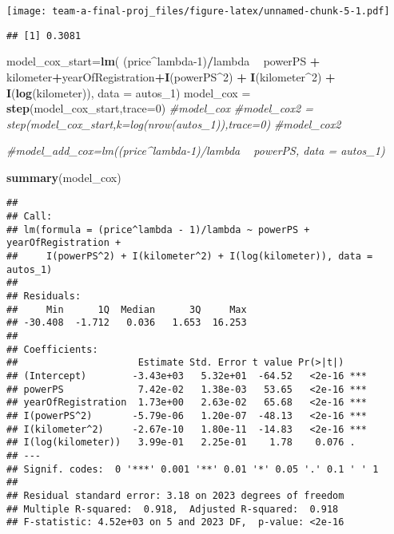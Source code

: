 \documentclass[]{article}
\newenvironment{Shaded}{\begin{snugshade}}{\end{snugshade}}
\newcommand{\CommentTok}[1]{\textcolor[rgb]{0.56,0.35,0.01}{\textit{#1}}}
\newcommand{\DataTypeTok}[1]{\textcolor[rgb]{0.13,0.29,0.53}{#1}}
\newcommand{\DecValTok}[1]{\textcolor[rgb]{0.00,0.00,0.81}{#1}}
\newcommand{\KeywordTok}[1]{\textcolor[rgb]{0.13,0.29,0.53}{\textbf{#1}}}
\newcommand{\NormalTok}[1]{#1}
\newcommand{\OperatorTok}[1]{\textcolor[rgb]{0.81,0.36,0.00}{\textbf{#1}}}
\newcommand{\StringTok}[1]{\textcolor[rgb]{0.31,0.60,0.02}{#1}}
\begin{document}
\texttt{[image: team-a-final-proj\_files/figure-latex/unnamed-chunk-5-1.pdf]}

\begin{Shaded}
\end{Shaded}

\begin{verbatim}
## [1] 0.3081
\end{verbatim}

\begin{Shaded}
\begin{Highlighting}[]
\NormalTok{model_cox_start=}\KeywordTok{lm}\NormalTok{( (price}\OperatorTok{^}\NormalTok{lambda}\DecValTok{-1}\NormalTok{)}\OperatorTok{/}\NormalTok{lambda }\OperatorTok{~}\StringTok{ }\NormalTok{powerPS }\OperatorTok{+}\StringTok{ }\NormalTok{kilometer}\OperatorTok{+}\NormalTok{yearOfRegistration}\OperatorTok{+}\KeywordTok{I}\NormalTok{(powerPS}\OperatorTok{^}\DecValTok{2}\NormalTok{) }\OperatorTok{+}\StringTok{ }\KeywordTok{I}\NormalTok{(kilometer}\OperatorTok{^}\DecValTok{2}\NormalTok{) }\OperatorTok{+}\StringTok{ }\KeywordTok{I}\NormalTok{(}\KeywordTok{log}\NormalTok{(kilometer)), }\DataTypeTok{data =}\NormalTok{ autos_}\DecValTok{1}\NormalTok{)}
\NormalTok{model_cox =}\StringTok{ }\KeywordTok{step}\NormalTok{(model_cox_start,}\DataTypeTok{trace=}\DecValTok{0}\NormalTok{)}
\CommentTok{#model_cox}
\CommentTok{#model_cox2 = step(model_cox_start,k=log(nrow(autos_1)),trace=0)}
\CommentTok{#model_cox2}

\CommentTok{#model_add_cox=lm((price^lambda-1)/lambda ~ powerPS, data = autos_1)}

\KeywordTok{summary}\NormalTok{(model_cox)}
\end{Highlighting}
\end{Shaded}

\begin{verbatim}
## 
## Call:
## lm(formula = (price^lambda - 1)/lambda ~ powerPS + yearOfRegistration + 
##     I(powerPS^2) + I(kilometer^2) + I(log(kilometer)), data = autos_1)
## 
## Residuals:
##     Min      1Q  Median      3Q     Max 
## -30.408  -1.712   0.036   1.653  16.253 
## 
## Coefficients:
##                     Estimate Std. Error t value Pr(>|t|)    
## (Intercept)        -3.43e+03   5.32e+01  -64.52   <2e-16 ***
## powerPS             7.42e-02   1.38e-03   53.65   <2e-16 ***
## yearOfRegistration  1.73e+00   2.63e-02   65.68   <2e-16 ***
## I(powerPS^2)       -5.79e-06   1.20e-07  -48.13   <2e-16 ***
## I(kilometer^2)     -2.67e-10   1.80e-11  -14.83   <2e-16 ***
## I(log(kilometer))   3.99e-01   2.25e-01    1.78    0.076 .  
## ---
## Signif. codes:  0 '***' 0.001 '**' 0.01 '*' 0.05 '.' 0.1 ' ' 1
## 
## Residual standard error: 3.18 on 2023 degrees of freedom
## Multiple R-squared:  0.918,  Adjusted R-squared:  0.918 
## F-statistic: 4.52e+03 on 5 and 2023 DF,  p-value: <2e-16
\end{verbatim}
\end{document}
